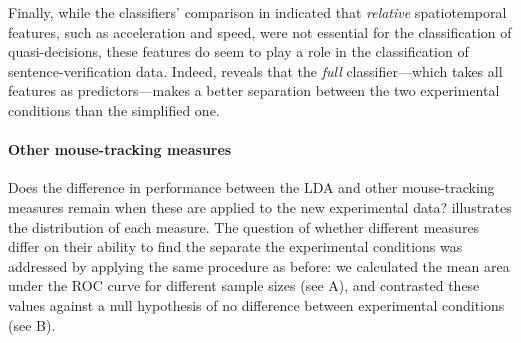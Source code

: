 \documentclass{article}
\begin{document}
Finally, while the classifiers' comparison in  indicated that \emph{relative} spatiotemporal features, such as acceleration and speed, were not essential for the classification of quasi-decisions, these features do seem to play a role in the classification of sentence-verification data. Indeed,  reveals that the \emph{full} classifier---which takes all features as predictors---makes a better separation between the two experimental conditions than the simplified one.   

\paragraph{Other mouse-tracking measures}
Does the difference in performance between the LDA and other mouse-tracking measures remain when these are applied to the new experimental data?
 illustrates the distribution of each measure.
The question of whether different measures differ on their ability to find the separate the experimental conditions was addressed by applying the same procedure as before: we calculated the mean area under the ROC curve for different sample sizes (see A), and contrasted these values against a null hypothesis of no difference between experimental conditions (see B).%
\end{document}
